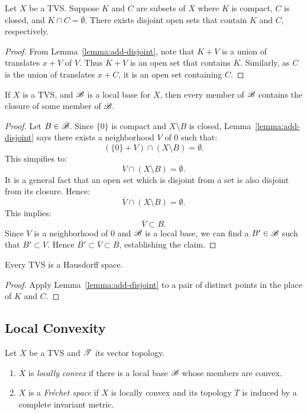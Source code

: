 \begin{theorem}
	Let $X$ be a TVS. Suppose $K$ and $C$ are subsets of $X$ where $K$ is compact, $C$ is closed, and $K \cap C = \emptyset$. There exists disjoint open sets that contain $K$ and $C$, respectively.
\end{theorem}
	\begin{proof}
		From Lemma~\ref{lemma:add-disjoint}, note that $K+V$ is a union of translates $x+V$ of $V$. Thus $K+V$ is an open set that contains $K$. Similarly, as $C$ is the union of translates $x + C$, it is an open set containing $C$.
	\end{proof}

\begin{corollary}
	If $X$ is a TVS, and $\mathscr{B}$ is a local base for $X$, then every member of $\mathscr{B}$ contains the closure of some member of $\mathscr{B}$.
\end{corollary}
	\begin{proof}
		Let $B \in \mathscr{B}$. Since $\{0\}$ is compact and $X \setminus B$ is closed, Lemma~\ref{lemma:add-disjoint} says there exists a neighborhood $V$ of $0$ such that:
		\[
			(\{0\} + V) \cap (X \setminus B) = \emptyset.
		\] 
		This simpifies to:
		\[
			V \cap (X \setminus B) = \emptyset.
		\] 
		It is a general fact that an open set which is disjoint from a set is also disjoint from its closure. Hence:
		\[
			\overline{V} \cap (X \setminus B) = \emptyset.
		\] 
		This implies:
		\[
			\overline{V} \subset B.
		\] 
		Since $V$ is a neighborhood of $0$ and $\mathscr{B}$ is a local base, we can find a $B' \in \mathscr{B}$ such that $B' \subset V$. Hence $\overline{B'} \subset \overline{V} \subset B$, establishing the claim.
	\end{proof}

\begin{corollary}
	Every TVS is a Hausdorff space.
\end{corollary}
	\begin{proof}
		Apply Lemma~\ref{lemma:add-disjoint} to a pair of distinct points in the place of $K$ and $C$. 
	\end{proof}


\subsection{Local Convexity}

\begin{definition}
	Let $X$ be a TVS and $\mathscr{T}$ its vector topology.
	\mbox{}
	\begin{enumerate}[label = (\alph*),itemsep=1pt,topsep=3pt]
		\item $X$ is \emph{locally convex} if there is a local base $\mathscr{B}$ whose members are convex.
		\item $X$ is a \emph{Fr\'echet space} if $X$ is locally convex and its topology $T$ is induced by a complete invariant metric.
	\end{enumerate}
\end{definition}

